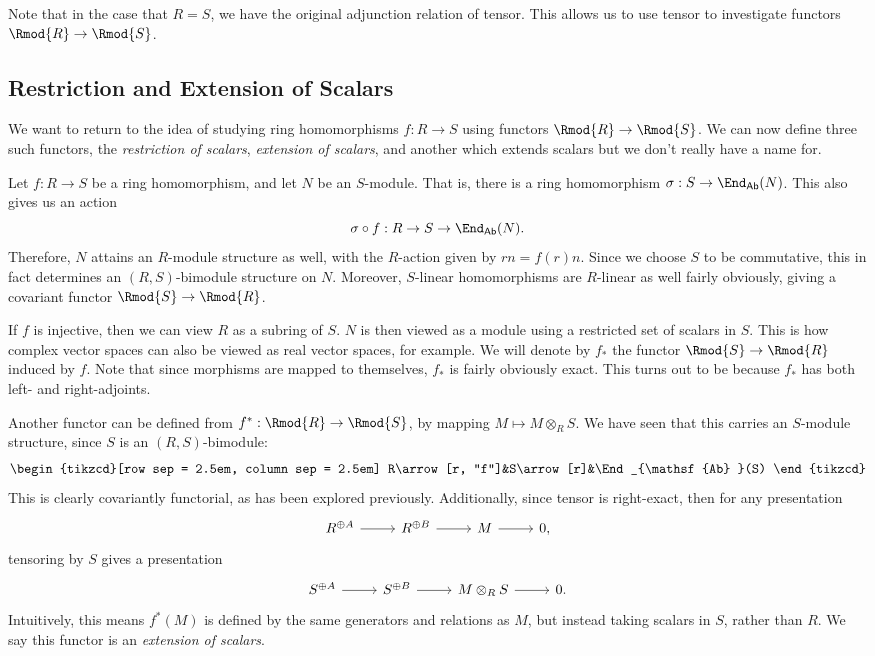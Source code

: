 Note that in the case that $R=S$, we have the original adjunction relation of tensor. This allows us to use tensor to investigate functors $\Rmod{R} \to \Rmod{S} $.

\subsection{Restriction and Extension of Scalars}
We want to return to the idea of studying ring homomorphisms $f : R \to S$ using functors $\Rmod{R} \to \Rmod{S} $. We can now define three such functors, the \emph{restriction of scalars}, \emph{extension of scalars}, and another which extends scalars but we don't really have a name for.

Let $f : R \to S$ be a ring homomorphism, and let $N$ be an $S$-module. That is, there is a ring homomorphism $\sigma : S \to \End_{\mathsf{Ab} }(N) $. This also gives us an action
\[
	\sigma \circ f : R \to S\to \End_{\mathsf{Ab} }(N) 
.\]
Therefore, $N$ attains an $R$-module structure as well, with the $R$-action given by $rn=f(r)n$. Since we choose $S$ to be commutative, this in fact determines an $(R,S)$-bimodule structure on $N$. Moreover, $S$-linear homomorphisms are $R$-linear as well fairly obviously, giving a covariant functor $\Rmod{S} \to \Rmod{R} $.

If $f$ is injective, then we can view $R$ as a subring of $S$. $N$ is then viewed as a module using a restricted set of scalars in $S$. This is how complex vector spaces can also be viewed as real vector spaces, for example. We will denote by $f_*$ the functor $\Rmod{S} \to \Rmod{R} $ induced by $f$. Note that since morphisms are mapped to themselves, $f_*$ is fairly obviously exact. This turns out to be because $f_*$ has both left- and right-adjoints.

Another functor can be defined from $f^*:\Rmod{R} \to \Rmod{S} $, by mapping $M\mapsto M\otimes _RS$. We have seen that this carries an $S$-module structure, since $S$ is an $(R,S)$-bimodule:
\[\begin{tikzcd}[row sep = 2.5em, column sep = 2.5em]
	R\arrow[r, "f"]&S\arrow[r]&\End_{\mathsf{Ab} }(S) 
\end{tikzcd}\]
This is clearly covariantly functorial, as has been explored previously. Additionally, since tensor is right-exact, then for any presentation
\[\begin{tikzcd}[row sep = 2.5em, column sep = 2.5em]
	R^{\oplus A} \arrow[r]&R^{\oplus B} \arrow[r]&M\arrow[r]&0,
\end{tikzcd}\]
tensoring by $S$ gives a presentation
\[\begin{tikzcd}[row sep = 2.5em, column sep = 2.5em]
	S^{\oplus A} \arrow[r]&S^{\oplus B} \arrow[r]&M\otimes _RS\arrow[r]&0.
\end{tikzcd}\]
Intuitively, this means $f^*(M)$ is defined by the same generators and relations as $M$, but instead taking scalars in $S$, rather than $R$. We say this functor is an \emph{extension of scalars}.

